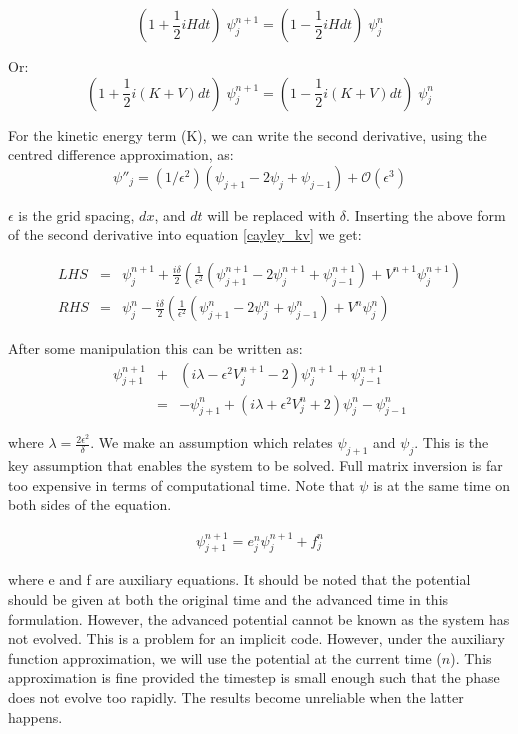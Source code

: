 \begin{equation}
(1+ \frac{1}{2} i H dt) \;\psi_{j}^{n+1} =  (1- \frac{1}{2} i H dt) \; \psi_{j}^n
\end{equation}

\noindent Or: 
\begin{equation}
\label{cayley_kv}
(1+ \frac{1}{2} i (K+V) dt) \;\psi_{j}^{n+1} =  (1- \frac{1}{2} i (K+V) dt) \; \psi_{j}^n
\end{equation}

\noindent For the kinetic energy term (K), we can write the second derivative, using the centred difference approximation, as:
\begin{equation}
\psi''_{j} = (1/\epsilon^2)(\psi_{j+1} - 2\psi_j + \psi_{j-1}) + \mathcal{O} (\epsilon^3)
\end{equation}

\noindent $\epsilon$ is the grid spacing, $dx$, and $dt$ will be replaced with $\delta$. Inserting the above form of the second derivative into equation \ref{cayley_kv} we get:

\begin{eqnarray}
LHS &=&\psi_j^{n+1} +\frac{i\delta}{2} (\frac{1}{\epsilon^2} (\psi_{j+1}^{n+1} -2\psi_j^{n+1} +\psi_{j-1}^{n+1}) +V^{n+1}\psi_j^{n+1}) \nonumber \\
RHS &=& \psi_j^{n} - \frac{i\delta}{2} ( \frac{1}{\epsilon^2} (\psi_{j+1}^{n} - 2\psi_j^{n} + \psi_{j-1}^{n})  + V^n\psi_{j}^n)
\end{eqnarray}

\noindent After some manipulation this can be written as:
\begin{eqnarray}
\label{evol_psi}
\psi_{j+1}^{n+1} &+& (i\lambda - \epsilon^2 V_{j}^{n+1} -2) \psi_{j}^{n+1} + \psi_{j-1}^{n+1} \nonumber \\
	&=& - \psi_{j+1}^n + (i\lambda + \epsilon^2 V_{j}^n +2) \psi_{j}^n - \psi_{j-1}^n
\end{eqnarray}

\noindent where $\lambda = \frac{2\epsilon^2}{\delta}$. We make an assumption which relates $\psi_{j+1}$ and $\psi_j$. This is the key assumption that enables the system to be solved. Full matrix inversion is far too expensive in terms of computational time. Note that $\psi$ is at the same time on both sides of the equation.

\begin{eqnarray}
\psi_{j+1}^{n+1} = e_j^n \psi_j^{n+1}  + f_j^n
\end{eqnarray}

\noindent where e and f are auxiliary equations. It should be noted that the potential should be given at both the original time and the advanced time in this formulation. However, the advanced potential cannot be known as the system has not evolved. This is a problem for an implicit code. However, under the auxiliary function approximation, we will use the potential at the current time ($n$). This approximation is fine provided the timestep is small enough such that the phase does not evolve too rapidly. The results become unreliable when the latter happens.

